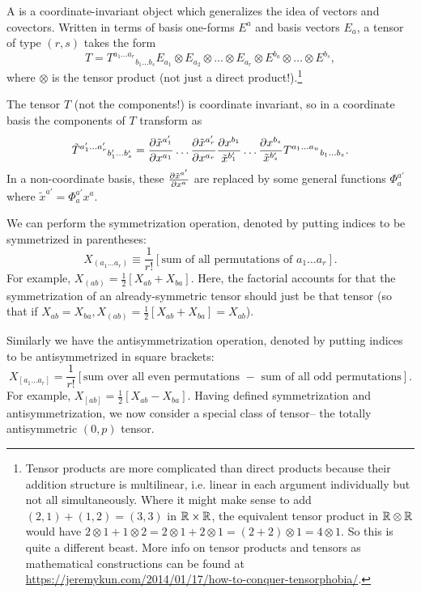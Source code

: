 \begin{defn}
A  is a coordinate-invariant object which generalizes the idea of vectors and covectors. Written in terms of basis one-forms $E^a$ and basis vectors $E_a$, a tensor of type $(r,s)$ takes the form
$$T={T^{a_1\ldots a_r}}_{b_1\ldots b_s} E_{a_1}\otimes E_{a_2}\otimes\ldots \otimes E_{a_r} \otimes E^{b_a}\otimes \ldots \otimes E^{b_s},$$
where $\otimes$ is the tensor product (not just a direct product!).\footnote{Tensor products are more complicated than direct products because their addition structure is multilinear, i.e. linear in each argument individually but not all simultaneously. Where it might make sense to add $(2,1)+(1,2)=(3,3)$ in $\mathbb{R}\times \mathbb{R}$, the equivalent tensor product in $\mathbb{R} \otimes \mathbb{R}$ would have $2 \otimes 1 + 1\otimes 2 = 2\otimes 1 + 2 \otimes 1= (2+2)\otimes 1 = 4 \otimes 1$. So this is quite a different beast. More info on tensor products and tensors as mathematical constructions can be found at \url{https://jeremykun.com/2014/01/17/how-to-conquer-tensorphobia/}.}
\end{defn}

The tensor $T$ (not the components!) is coordinate invariant, so in a coordinate basis the components of $T$ transform as
$${{\tilde T}^{a_1'\ldots a_r'}}{}_{b_1'\ldots b_s'}=\frac{\partial \tilde x^{a_1'}}{\partial x^{a_1}} \ldots \frac{\partial \tilde x^{a_r'}}{\partial x^{a_r}} \frac{\partial x^{b_1}}{\tilde x^{b_1'}} \ldots \frac{\partial x^{b_s}}{\tilde x^{b_s'}} {T^{a_1\ldots a_n}}_{b_1\ldots b_s}.$$
In a non-coordinate basis, these $\frac{\partial \tilde x^{a'}}{\partial x^a}$ are replaced by some general functions $\Phi ^{a'}_a$ where $\tilde x^{a'}=\Phi^{a'}_a x^a$.

We can perform the symmetrization operation, denoted by putting indices to be symmetrized in parentheses:
$$X_{(a_1 \ldots a_r)}\equiv \frac{1}{r!}\left[\text{sum of all permutations of }a_1\ldots a_r\right].$$
For example, $X_{(ab)}=\frac{1}{2}\left[X_{ab}+X_{ba}\right]$. Here, the factorial accounts for that the symmetrization of an already-symmetric tensor should just be that tensor (so that if $X_{ab}=X_{ba},X_{(ab)}=\frac{1}{2}[X_{ab}+X_{ba}]=X_{ab}$). 

Similarly we have the antisymmetrization operation, denoted by putting indices to be antisymmetrized in square brackets:
$$X_{[a_1\ldots a_r]}=\frac{1}{r!}\left[\text{sum over all even permutations } - \text { sum of all odd permutations}\right].$$
For example, $X_{[ab]}=\frac{1}{2}[X_{ab}-X_{ba}].$ Having defined symmetrization and antisymmetrization, we now consider a special class of tensor-- the totally antisymmetric $(0,p)$ tensor.

